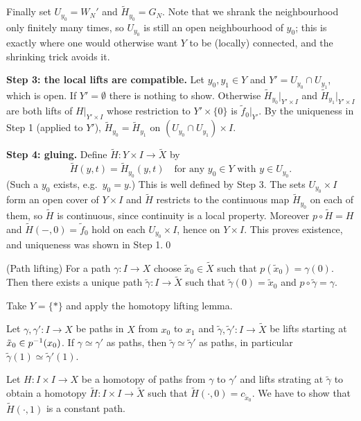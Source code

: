 \documentclass{article}
\begin{document}
\par
Finally set $ U_{y_0}=W_N' $ and $ \tilde H_{y_0}=G_N $. Note that we shrank the neighbourhood only finitely many times, so $ U_{y_0} $ is still an open neighbourhood of $ y_0 $; this is exactly where one would otherwise want $ Y $ to be (locally) connected, and the shrinking trick avoids it.
\par
\textbf{Step 3: the local lifts are compatible.} Let $ y_0,y_1\in Y $ and $ Y'=U_{y_0}\cap U_{y_1} $, which is open. If $ Y'=\emptyset $ there is nothing to show. Otherwise $ \tilde H_{y_0}|_{Y'\times I} $ and $ \tilde H_{y_1}|_{Y'\times I} $ are both lifts of $ H|_{Y'\times I} $ whose restriction to $ Y'\times\{0\} $ is $ \tilde f_0|_{Y'} $. By the uniqueness in Step 1 (applied to $ Y' $), $ \tilde H_{y_0}=\tilde H_{y_1} $ on $ (U_{y_0}\cap U_{y_1})\times I $.
\par
\textbf{Step 4: gluing.} Define $ \tilde H:Y\times I\to\tilde X $ by
\[
	\tilde H(y,t)=\tilde H_{y_0}(y,t)\quad\text{for any } y_0\in Y \text{ with } y\in U_{y_0}.
\]
(Such a $ y_0 $ exists, e.g.\ $ y_0=y $.) This is well defined by Step 3. The sets $ U_{y_0}\times I $ form an open cover of $ Y\times I $ and $ \tilde H $ restricts to the continuous map $ \tilde H_{y_0} $ on each of them, so $ \tilde H $ is continuous, since continuity is a local property. Moreover $ p\circ\tilde H=H $ and $ \tilde H(-,0)=\tilde f_0 $ hold on each $ U_{y_0}\times I $, hence on $ Y\times I $. This proves existence, and uniqueness was shown in Step 1.\qed
\begin{corollary}
	(Path lifting) For a path $ \gamma: I \to X $ choose $ \tilde x_0 \in \tilde X $ such that $ p(\tilde x_0) = \gamma(0) $. Then there exists a unique path $ \tilde \gamma: I \to \tilde X $ such that $ \tilde \gamma(0) = \tilde x_0 $ and $ p\circ\tilde \gamma = \gamma $.
\end{corollary}
\pf Take $ Y = \{*\} $ and apply the homotopy lifting lemma.
\begin{corollary}
  Let $ \gamma,\gamma': I \to X $ be paths in $ X $ from $ x_0 $ to $ x_1 $ and $ \tilde \gamma,\tilde \gamma': I \to \tilde X $ be lifts starting at $ \tilde x_0 \in {p}^{-1}(x_0) $. If $ \gamma\simeq \gamma' $ as paths, then $ \tilde \gamma \simeq \tilde \gamma' $ as paths, in particular $ \tilde \gamma(1) \simeq \tilde\gamma'(1) $.
\end{corollary}
\pf Let $ H: I\times I \to X $ be a homotopy of paths from $ \gamma $ to $ \gamma' $ and lifts strating at $ \tilde \gamma $ to obtain a homotopy $ \tilde H:I\times I \to \tilde X $ such that $ \tilde H(\cdot, 0) = c_{\tilde x_0} $. We have to show that $ \tilde H(\cdot, 1) $ is a constant path.\par
\end{document}
